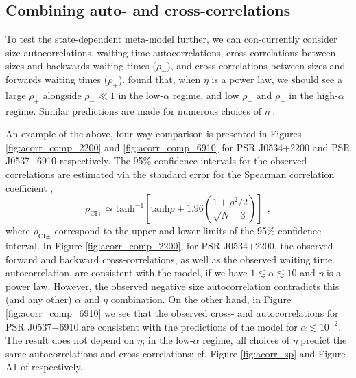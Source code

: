 \subsection{Combining auto- and cross-correlations}
\label{sec:acorr_combine}
To test the state-dependent meta-model further, we can con-currently consider size autocorrelations, waiting time autocorrelations, cross-correlations between sizes and backwards waiting times ($\rho_-$), and cross-correlations between sizes and forwards waiting times ($\rho_+$). \citet{Melatos2018} found that, when $\eta$ is a power law, we should see a large $\rho_+$ alongside $\rho_- \ll 1$ in the low-$\alpha$ regime, and low $\rho_+$ and $\rho_-$ in the high-$\alpha$ regime. Similar predictions are made for numerous choices of $\eta$ \citep{Carlin2019quasi}.

An example of the above, four-way comparison is presented in Figures \ref{fig:acorr_comp_2200} and \ref{fig:acorr_comp_6910} for PSR J0534$+$2200 and PSR J0537$-$6910 respectively. The 95\% confidence intervals for the observed correlations are estimated via the standard error for the Spearman correlation coefficient \citep{Bonett2000},
\begin{equation}
{\rho_{\textrm{CI}\pm} \simeq \textrm{tanh}^{-1}\left[\textrm{tanh} \rho \pm 1.96 \left(\frac{1 + \rho^2/2}{\sqrt{N-3}} \right)\right]}\ \ , \label{eq:ac_rhoci}
\end{equation}
where $\rho_{\textrm{CI}\pm}$ correspond to the upper and lower limits of the 95\% confidence interval. In Figure \ref{fig:acorr_comp_2200}, for PSR J0534$+$2200, the observed forward and backward cross-correlations, as well as the observed waiting time autocorrelation, are consistent with the model, if we have $1 \lesssim \alpha \lesssim 10$ and $\eta$ is a power law. However, the observed negative size autocorrelation contradicts this (and any other) $\alpha$ and $\eta$ combination. On the other hand, in Figure \ref{fig:acorr_comp_6910} we see that the observed cross- and autocorrelations for PSR J0537$-$6910 are consistent with the predictions of the model for $\alpha \lesssim 10^{-2}$. The result does not depend on $\eta$; in the low-$\alpha$ regime, all choices of $\eta$ predict the same autocorrelations and cross-correlations; cf. Figure \ref{fig:acorr_sp} and Figure A1 of \citet{Carlin2019quasi} respectively.

